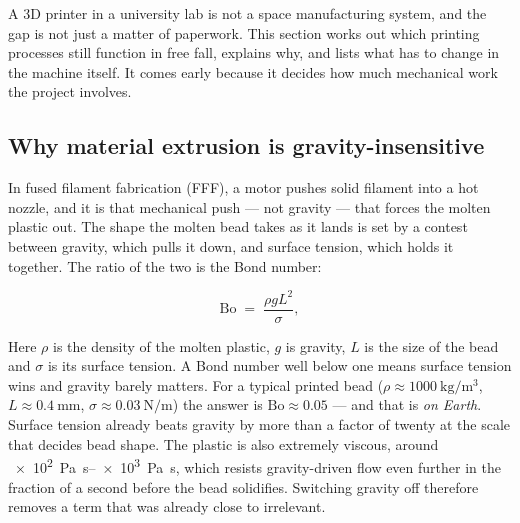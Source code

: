\documentclass[11pt,a4paper]{article}
\begin{document}
A 3D printer in a university lab is not a space manufacturing system, and the gap
is not just a matter of paperwork. This section works out which printing processes
still function in free fall, explains why, and lists what has to change in the
machine itself. It comes early because it decides how much mechanical work the
project involves.

\subsection{Why material extrusion is gravity-insensitive}
\label{sec:bond}

In fused filament fabrication (FFF), a motor pushes solid filament into a hot
nozzle, and it is that mechanical push --- not gravity --- that forces the molten
plastic out. The shape the molten bead takes as it lands is set by a contest
between gravity, which pulls it down, and surface tension, which holds it
together. The ratio of the two is the Bond number:

\begin{equation}
  \mathrm{Bo} \;=\; \frac{\rho g L^{2}}{\sigma},
\end{equation}

Here \(\rho\) is the density of the molten plastic, \(g\) is gravity, \(L\) is the
size of the bead and \(\sigma\) is its surface tension. A Bond number well below
one means surface tension wins and gravity barely matters. For a typical printed
bead (\(\rho \approx \SI{1000}{\kilogram\per\metre\cubed}\),
\(L \approx \SI{0.4}{\milli\metre}\),
\(\sigma \approx \SI{0.03}{\newton\per\metre}\)) the answer is
\(\mathrm{Bo} \approx 0.05\) --- and that is \emph{on Earth}. Surface tension
already beats gravity by more than a factor of twenty at the scale that decides
bead shape. The plastic is also extremely viscous, around
\SIrange{e2}{e3}{\pascal\second}, which resists gravity-driven flow even further
in the fraction of a second before the bead solidifies. Switching gravity off
therefore removes a term that was already close to irrelevant.
\end{document}
